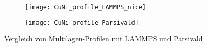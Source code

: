 \begin{figure}
  \captionsetup[subfigure]{singlelinecheck=false}
  \def\subfigwidth{7cm}
  \begin{subfigure}[t]{\subfigwidth}
    \texttt{[image: CuNi\_profile\_LAMMPS\_nice]}
  \end{subfigure}
  \hfill
  \begin{subfigure}[t]{\subfigwidth}
    \texttt{[image: CuNi\_profile\_Parsivald]}
  \end{subfigure}
  \caption{Vergleich von Multilagen-Profilen mit LAMMPS und Parsivald}
  \label{fig:multilayerresults}
\end{figure}
